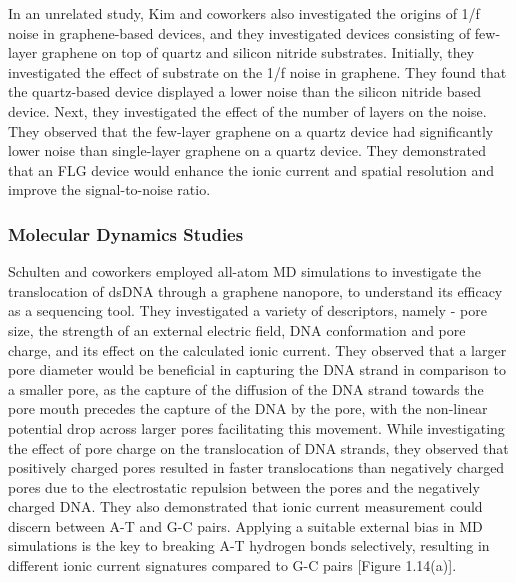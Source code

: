In an unrelated study, Kim and coworkers also investigated the origins of 1/f noise in graphene-based devices, and they investigated devices consisting of few-layer graphene on top of quartz and silicon nitride substrates\supercite{kumar_noise_2013}. Initially, they investigated the effect of substrate on the 1/f noise in graphene. They found that the quartz-based device displayed a lower noise than the silicon nitride based device. Next, they investigated the effect of the number of layers on the noise. They observed that the few-layer graphene on a quartz device had significantly lower noise than single-layer graphene on a quartz device. They demonstrated that an FLG device would enhance the ionic current and spatial resolution and improve the signal-to-noise ratio.

\subsubsection{Molecular Dynamics Studies}
Schulten and coworkers employed all-atom MD simulations to investigate the translocation of dsDNA through a graphene nanopore, to understand its efficacy as a sequencing tool.\supercite{sathe_computational_2011} They investigated a variety of descriptors, namely - pore size, the strength of an external electric field, DNA conformation and pore charge, and its effect on the calculated ionic current. They observed that a larger pore diameter would be beneficial in capturing the DNA strand in comparison to a smaller pore, as the capture of the diffusion of the DNA strand towards the pore mouth precedes the capture of the DNA by the pore, with the non-linear potential drop across larger pores facilitating this movement. While investigating the effect of pore charge on the translocation of DNA strands, they observed that positively charged pores resulted in faster translocations than negatively charged pores due to the electrostatic repulsion between the pores and the negatively charged DNA. They also demonstrated that ionic current measurement could discern between A-T and G-C pairs. Applying a suitable external bias in MD simulations is the key to breaking A-T hydrogen bonds selectively, resulting in different ionic current signatures compared to G-C pairs [Figure 1.14(a)].

